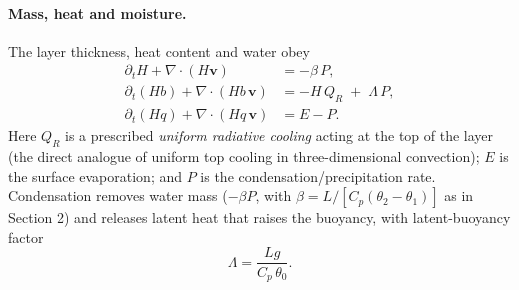 \documentclass{article}
\begin{document}
\paragraph{Mass, heat and moisture.} The layer thickness, heat content and water obey
\begin{align}
    \partial_t H + \nabla\cdot(H\mathbf{v}) &= -\beta\,P, \label{eq:active-mass}\\
    \partial_t(Hb) + \nabla\cdot(Hb\,\mathbf{v}) &= -H\,Q_R \;+\; \Lambda\,P, \label{eq:active-buoy}\\
    \partial_t(Hq) + \nabla\cdot(Hq\,\mathbf{v}) &= E - P. \label{eq:active-moist}
\end{align}
Here $Q_R$ is a prescribed \emph{uniform radiative cooling} acting at the top of the layer (the direct analogue of uniform top cooling in three-dimensional convection); $E$ is the surface evaporation; and $P$ is the condensation/precipitation rate. Condensation removes water mass ($-\beta P$, with $\beta=L/[C_p(\theta_2-\theta_1)]$ as in Section 2) and releases latent heat that raises the buoyancy, with latent-buoyancy factor
\begin{equation}
    \Lambda = \frac{Lg}{C_p\,\theta_0}.
\end{equation}
\end{document}
